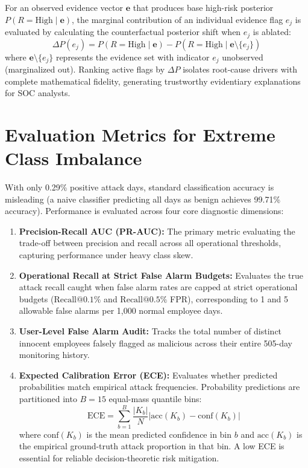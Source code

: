 \documentclass[12pt,a4paper]{report}
\begin{document}
For an observed evidence vector $\mathbf{e}$ that produces base high-risk posterior $P(R = \text{High} \mid \mathbf{e})$, the marginal contribution of an individual evidence flag $e_j$ is evaluated by calculating the counterfactual posterior shift when $e_j$ is ablated:
\begin{equation}
\Delta P(e_j) = P(R = \text{High} \mid \mathbf{e}) - P\left(R = \text{High} \mid \mathbf{e} \setminus \{e_j\}\right)
\label{eq:ablation_delta}
\end{equation}
where $\mathbf{e} \setminus \{e_j\}$ represents the evidence set with indicator $e_j$ unobserved (marginalized out). Ranking active flags by $\Delta P$ isolates root-cause drivers with complete mathematical fidelity, generating trustworthy evidentiary explanations for SOC analysts.

\section{Evaluation Metrics for Extreme Class Imbalance}
With only 0.29\% positive attack days, standard classification accuracy is misleading (a naive classifier predicting all days as benign achieves 99.71\% accuracy). Performance is evaluated across four core diagnostic dimensions:
\begin{enumerate}
    \item \textbf{Precision-Recall AUC (PR-AUC):} The primary metric evaluating the trade-off between precision and recall across all operational thresholds, capturing performance under heavy class skew.
    \item \textbf{Operational Recall at Strict False Alarm Budgets:} Evaluates the true attack recall caught when false alarm rates are capped at strict operational budgets ($\text{Recall}@0.1\%$ and $\text{Recall}@0.5\%$ FPR), corresponding to 1 and 5 allowable false alarms per 1,000 normal employee days.
    \item \textbf{User-Level False Alarm Audit:} Tracks the total number of distinct innocent employees falsely flagged as malicious across their entire 505-day monitoring history.
    \item \textbf{Expected Calibration Error (ECE):} Evaluates whether predicted probabilities match empirical attack frequencies. Probability predictions are partitioned into $B = 15$ equal-mass quantile bins:
    \begin{equation}
    \text{ECE} = \sum_{b=1}^B \frac{|K_b|}{N} \left|\text{acc}(K_b) - \text{conf}(K_b)\right|
    \label{eq:ece}
    \end{equation}
    where $\text{conf}(K_b)$ is the mean predicted confidence in bin $b$ and $\text{acc}(K_b)$ is the empirical ground-truth attack proportion in that bin. A low ECE is essential for reliable decision-theoretic risk mitigation.
\end{enumerate}
\end{document}
